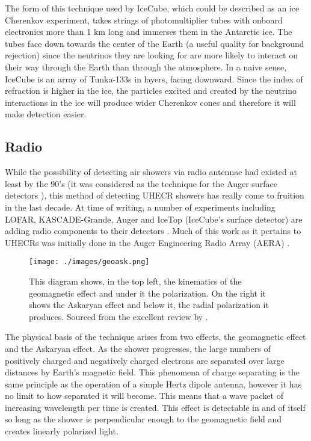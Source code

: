 The form of this technique used by IceCube, which could be described as an ice Cherenkov experiment, takes strings of photomultiplier tubes with onboard electronics more than 1 km long and immerses them in the Antarctic ice. The tubes face down towards the center of the Earth (a useful quality for background rejection) since the neutrinos they are looking for are more likely to interact on their way through the Earth than through the atmosphere. In a naive sense, IceCube is an array of Tunka-133s in layers, facing downward. Since the index of refraction is higher in the ice, the particles excited and created by the neutrino interactions in the ice will produce wider Cherenkov cones and therefore it will make detection easier.

\subsection{Radio}
\label{radio}
While the possibility of detecting air showers via radio antennae had existed at least by the 90's (it was considered as the technique for the Auger surface detectors \cite{firstcher}), this method of detecting UHECR showers has really come to fruition in the last decade. At time of writing, a number of experiments including LOFAR, KASCADE-Grande, Auger and IceTop (IceCube's surface detector) are adding radio components to their detectors \cite{schroeder}. Much of this work as it pertains to UHECRs was initially done in the Auger Engineering Radio Array (AERA) \cite{radioaera}. 
\begin{figure}[h!]
\begin{center}
\texttt{[image: ./images/geoask.png]}
\caption[Radio Emission Diagram]{This diagram shows, in the top left, the kinematics of the geomagnetic effect and under it the polarization. On the right it shows the Askaryan effect and below it, the radial polarization it produces. Sourced from the excellent review by \textcite{schroeder}.}
\label{rademission}
\end{center}
\end{figure}
The physical basis of the technique arises from two effects, the geomagnetic effect and the Askaryan effect. As the shower progresses, the large numbers of positively charged and negatively charged electrons are separated over large distances by Earth's magnetic field. This phenomena of charge separating is the same principle as the operation of a simple Hertz dipole antenna, however it has no limit to how separated it will become. This means that a wave packet of increasing wavelength per time is created. This effect is detectable in and of itself so long as the shower is perpendicular enough to the geomagnetic field and creates linearly polarized light. 


